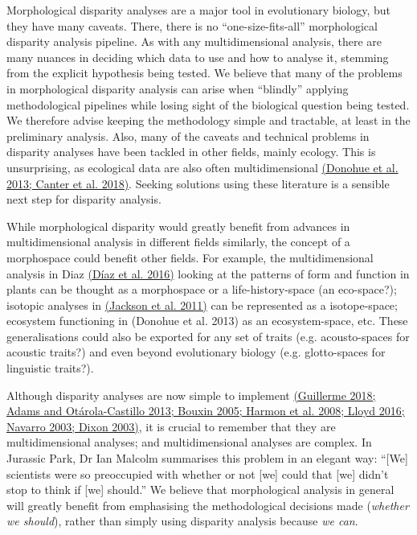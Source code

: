 Morphological disparity analyses are a major tool in evolutionary
biology, but they have many caveats. There, there is no
``one-size-fits-all'' morphological disparity analysis pipeline. As with
any multidimensional analysis, there are many nuances in deciding which
data to use and how to analyse it, stemming from the explicit hypothesis
being tested. We believe that many of the problems in morphological
disparity analysis can arise when ``blindly'' applying methodological
pipelines while losing sight of the biological question being tested. We
therefore advise keeping the methodology simple and tractable, at least
in the preliminary analysis. Also, many of the caveats and technical
problems in disparity analyses have been tackled in other fields, mainly
ecology. This is unsurprising, as ecological data are also often
multidimensional
\href{https://paperpile.com/c/sTGYvp/krNU+60H0}{(Donohue et al. 2013;
Canter et al. 2018)}. Seeking solutions using these literature is a
sensible next step for disparity analysis.

While morphological disparity would greatly benefit from advances in
multidimensional analysis in different fields similarly, the concept of
a morphospace could benefit other fields. For example, the
multidimensional analysis in Diaz
\href{https://paperpile.com/c/sTGYvp/47fI}{(Díaz et al. 2016)} looking
at the patterns of form and function in plants can be thought as a
morphospace or a life-history-space (an eco-space?); isotopic analyses
in \href{https://paperpile.com/c/sTGYvp/PwyQ}{(Jackson et al. 2011)} can
be represented as a isotope-space; ecosystem functioning in (Donohue et
al. 2013) as an ecosystem-space, etc. These generalisations could also
be exported for any set of traits (e.g. acousto-spaces for acoustic
traits?) and even beyond evolutionary biology (e.g. glotto-spaces for
linguistic traits?).

Although disparity analyses are now simple to implement
\href{https://paperpile.com/c/sTGYvp/xDqf+J2G1+9JdS+9Zoi+bCsU+EmTR+2KmX}{(Guillerme
2018; Adams and Otárola-Castillo 2013; Bouxin 2005; Harmon et al. 2008;
Lloyd 2016; Navarro 2003; Dixon 2003)}, it is crucial to remember that
they are multidimensional analyses; and multidimensional analyses are
complex. In Jurassic Park, Dr Ian Malcolm summarises this problem in an
elegant way: ``{[}We{]} scientists were so preoccupied with whether or
not {[}we{]} could that {[}we{]} didn't stop to think if {[}we{]}
should.'' We believe that morphological analysis in general will greatly
benefit from emphasising the methodological decisions made
(\emph{whether we should}), rather than simply using disparity analysis
because \emph{we can}.

